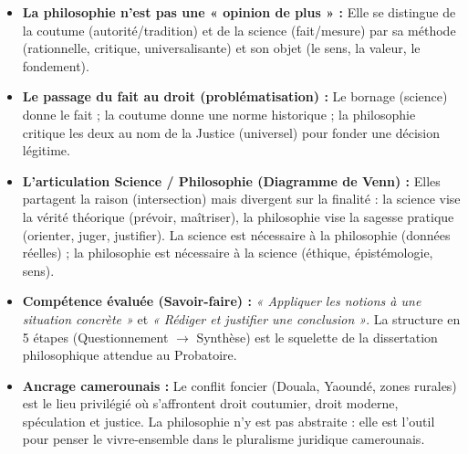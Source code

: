 \documentclass[11pt]{article}
\newcommand{\cle}[1]{{\popxbold\color{popdark}#1}}
\newcounter{popsec}
\newcounter{popsub}
\newcommand{\courssub}[1]{%
  \stepcounter{popsub}%
  \par\vspace{9pt}\noindent{\popxbold\fontsize{11.5}{13}\selectfont\color{popink}{\color{poporange}\thepopsec.\thepopsub}\hspace{6pt}#1}\par\nopagebreak\vspace{4pt}
}
\begin{document}
\courssub{Bilan de l'activité}
\begin{aretenir}
\begin{itemize}
    \item \textbf{La philosophie n'est pas une « opinion de plus » :} Elle se distingue de la coutume (autorité/tradition) et de la science (fait/mesure) par sa \cle{méthode} (rationnelle, critique, universalisante) et son \cle{objet} (le sens, la valeur, le fondement).
    \item \textbf{Le passage du fait au droit (problématisation) :} Le bornage (science) donne le fait ; la coutume donne une norme historique ; la philosophie \cle{critique} les deux au nom de la \cle{Justice} (universel) pour fonder une décision \cle{légitime}.
    \item \textbf{L'articulation Science / Philosophie (Diagramme de Venn) :} Elles partagent la raison (intersection) mais divergent sur la finalité : la science vise la \cle{vérité théorique} (prévoir, maîtriser), la philosophie vise la \cle{sagesse pratique} (orienter, juger, justifier). La science est \cle{nécessaire} à la philosophie (données réelles) ; la philosophie est \cle{nécessaire} à la science (éthique, épistémologie, sens).
    \item \textbf{Compétence évaluée (Savoir-faire) :} \emph{« Appliquer les notions à une situation concrète »} et \emph{« Rédiger et justifier une conclusion »}. La structure en 5 étapes (Questionnement $\to$ Synthèse) est le squelette de la \cle{dissertation philosophique} attendue au Probatoire.
    \item \textbf{Ancrage camerounais :} Le conflit foncier (Douala, Yaoundé, zones rurales) est le \cle{lieu privilégié} où s'affrontent droit coutumier, droit moderne, spéculation et justice. La philosophie n'y est pas abstraite : elle est l'outil pour \cle{penser le vivre-ensemble} dans le pluralisme juridique camerounais.
\end{itemize}
\end{aretenir}
\end{document}
